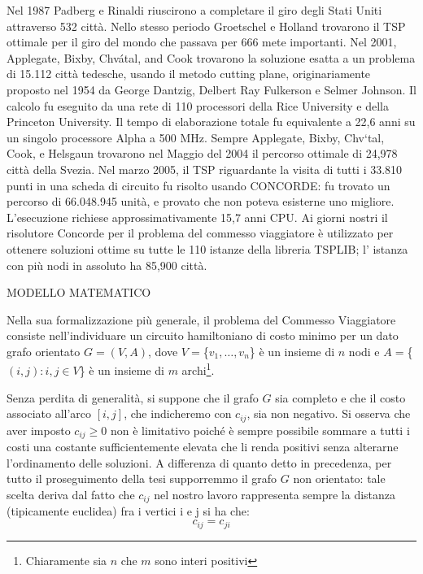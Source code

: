 \documentclass[11pt]{article}
\begin{document}
Nel 1987  Padberg e Rinaldi riuscirono a completare il giro degli Stati Uniti attraverso 532 citt\`a. Nello stesso periodo Groetschel e Holland trovarono il TSP ottimale per il giro del mondo che passava per 666 mete importanti. 
Nel 2001, Applegate, Bixby, Chvátal, and Cook trovarono la soluzione esatta a un problema di 15.112 citt\`a tedesche, usando il metodo cutting plane, originariamente proposto nel 1954 da George Dantzig, Delbert Ray Fulkerson e Selmer Johnson. Il calcolo fu eseguito da una rete di 110 processori della Rice University e della Princeton University. Il tempo di elaborazione totale fu equivalente a 22,6 anni su un singolo processore Alpha a 500 MHz.
Sempre Applegate, Bixby, Chv\a`tal, Cook, e Helsgaun trovarono nel Maggio del 2004 il percorso ottimale di 24,978 citt\`a della Svezia. 
Nel marzo 2005, il TSP riguardante la visita di tutti i 33.810 punti in una scheda di circuito fu risolto usando CONCORDE: fu trovato un percorso di 66.048.945 unit\`a, e provato che non poteva esisterne uno migliore. L'esecuzione richiese approssimativamente 15,7 anni CPU. 
Ai giorni nostri il risolutore Concorde per il problema del commesso viaggiatore \`e utilizzato per ottenere soluzioni ottime su tutte le 110 istanze della libreria TSPLIB; l' istanza con pi\`u nodi in assoluto ha 85,900 citt\`a. 

\vspace{2\baselineskip}

MODELLO MATEMATICO
\vspace{2\baselineskip}

Nella sua formalizzazione pi\`u generale, il problema del Commesso Viaggiatore consiste nell'individuare un circuito hamiltoniano di costo minimo per un dato grafo orientato $G=(V,A)$, dove $V = $\{$ {v_1,\dots,v_n} $\}$ $ \`e un insieme di $n$ nodi e $A = $\{$ {(i,j): i, j \in V} $\}$ $ \`e un insieme di $m$ archi\footnote{Chiaramente sia $n$ che $m$ sono interi positivi}. 

Senza perdita di generalit\`a, si suppone che il grafo $G$ sia completo e che il costo associato all'arco $[i,j]$, che indicheremo con $c_{ij}$, sia non negativo. Si osserva che aver imposto $c_{ij} \ge 0$ non \`e limitativo poich\'e \`e sempre possibile sommare a tutti i costi una costante sufficientemente elevata che li renda positivi senza alterarne l'ordinamento delle soluzioni. 
A differenza di quanto detto in precedenza, per tutto il proseguimento della tesi supporremmo il grafo $G$ non orientato: tale scelta deriva dal fatto che $c_{ij}$ nel nostro lavoro rappresenta sempre la distanza (tipicamente euclidea) fra i vertici i e j si ha che:
$$c_{ij} = c_{ji}$$
\end{document}
